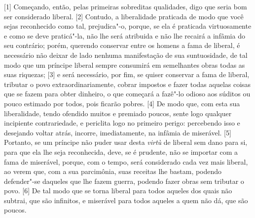 
{[}1{]} Começando, então, pelas primeiras sobreditas qualidades, digo
que seria bom ser considerado liberal. {[}2{]} Contudo, a liberalidade
praticada de modo que você sejas reconhecido como tal, prejudica"-o,
porque, se ela é praticada virtuosamente e como se deve praticá"-la, não
lhe será atribuida e não lhe recairá a infâmia do seu contrário; porém,
querendo conservar entre os homens a fama de liberal, é necessário não
deixar de lado nenhuma manifestação de sua suntuosidade, de tal modo que
um príncipe liberal sempre consumirá em semelhantes obras todas as suas
riquezas; {[}3{]} e será necessário, por fim, se quiser conservar a fama
de liberal, tributar o povo extraordinariamente, cobrar impostos e fazer
todas aquelas coisas que se fazem para obter dinheiro, o que começará a
fazê"-lo odioso aos súditos ou pouco estimado por todos, pois ficarão
pobres. {[}4{]} De modo que, com esta sua liberalidade, tendo ofendido
muitos e premiado poucos, sente logo qualquer incipiente contrariedade,
e periclita logo no primeiro perigo: percebendo isso e desejando voltar
atrás, incorre, imediatamente, na infâmia de miserável. {[}5{]}
Portanto, se um príncipe não puder usar desta \emph{virtù} de liberal
sem dano para si, para que ela lhe seja reconhecida, deve, se é
prudente, não se importar com a fama de miserável, porque, com o tempo,
será considerado cada vez mais liberal, ao verem que, com a sua
parcimônia, suas receitas lhe bastam, podendo defender"-se daqueles que
lhe fazem guerra, podendo fazer obras sem tributar o povo. {[}6{]} De
tal modo que se torna liberal para todos aqueles dos quais não subtrai,
que são infinitos, e miserável para todos aqueles a quem não dá, que são
poucos.

